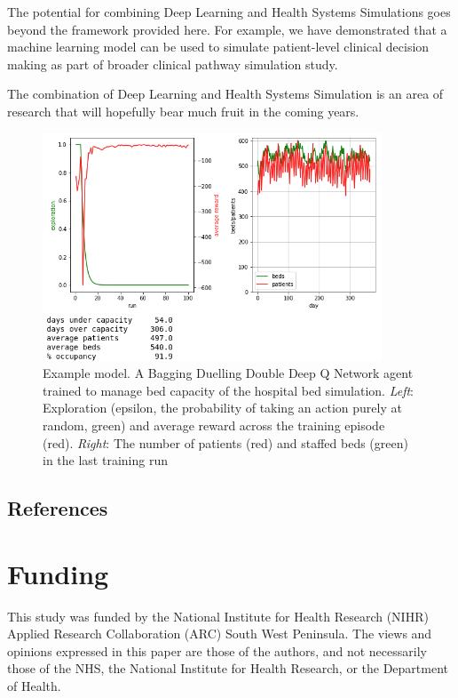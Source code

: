 \documentclass{article}
\begin{document}
\begin{multicols}{2}
The potential for combining Deep Learning and Health Systems Simulations goes beyond the framework provided here. For example, we have demonstrated that a machine learning model can be used to simulate patient-level clinical decision making \cite{allen_can_2019} as part of broader clinical pathway simulation study.

The combination of Deep Learning and Health Systems Simulation is an area of research that will hopefully bear much fruit in the coming years.

\end{multicols}

\begin{figure}
\centering
\includegraphics[width=0.9\textwidth]{images/res_dqn.png}
\caption{Example model. A Bagging Duelling Double Deep Q Network agent trained to manage bed capacity of the hospital bed simulation. \emph{Left}: Exploration (epsilon, the probability of taking an action purely at random, green) and average reward across the training episode (red). \emph{Right}: The number of patients (red) and staffed beds (green) in the last training run}
\label{fig:results_dqn}
\end{figure}

\begin{multicols}{2}

\section{References}


\end{multicols}

\section*{Funding}

This study was funded by the National Institute for Health Research (NIHR) Applied Research Collaboration (ARC) South West Peninsula. The views and opinions expressed in this paper are those of the authors, and not necessarily those of the NHS, the National Institute for Health Research, or the Department of Health.
\end{document}
